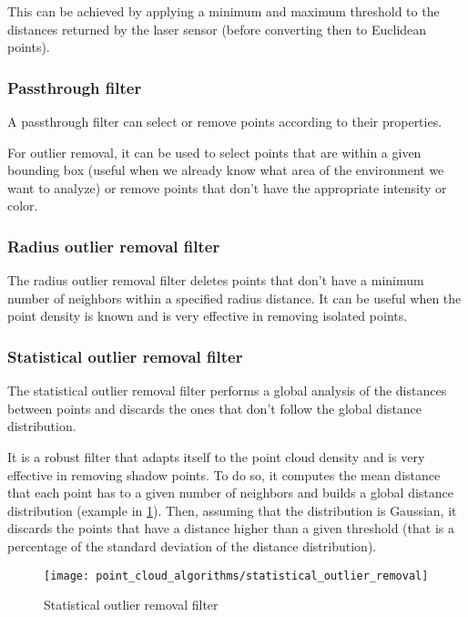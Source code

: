 This can be achieved by applying a minimum and maximum threshold to the distances returned by the laser sensor (before converting then to Euclidean points).


\subsubsection{Passthrough filter}

A passthrough filter can select or remove points according to their properties.

For outlier removal, it can be used to select points that are within a given bounding box (useful when we already know what area of the environment we want to analyze) or remove points that don't have the appropriate intensity or color.


\subsubsection{Radius outlier removal filter}

The radius outlier removal filter deletes points that don't have a minimum number of neighbors within a specified radius distance. It can be useful when the point density is known and is very effective in removing isolated points.


\subsubsection{Statistical outlier removal filter}

The statistical outlier removal filter \cite{Rusu2010a} performs a global analysis of the distances between points and discards the ones that don't follow the global distance distribution.

It is a robust filter that adapts itself to the point cloud density and is very effective in removing shadow points. To do so, it computes the mean distance that each point has to a given number of neighbors and builds a global distance distribution (example in \cref{fig:point-cloud-algorithms_statistical-outlier-removal}). Then, assuming that the distribution is Gaussian, it discards the points that have a distance higher than a given threshold (that is a percentage of the standard deviation of the distance distribution).

\begin{figure}[H]
	\centering
	\texttt{[image: point\_cloud\_algorithms/statistical\_outlier\_removal]}
	\caption{Statistical outlier removal filter\protect\footnotemark}
	\label{fig:point-cloud-algorithms_statistical-outlier-removal}
\end{figure}


